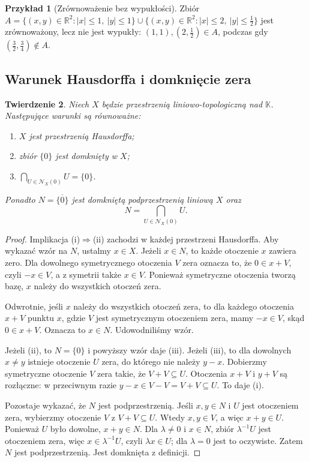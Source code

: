 \documentclass[11pt,a4paper]{article}
\numberwithin{equation}{section}
\theoremstyle{plain}
\newtheorem{twierdzenie}{Twierdzenie}[section]
\theoremstyle{definition}
\newtheorem{przyklad}[twierdzenie]{Przykład}
\theoremstyle{remark}
\newcommand{\R}{\mathbb R}
\newcommand{\K}{\mathbb K}
\newcommand{\cl}[1]{\overline{#1}}
\begin{document}
\begin{przyklad}[Zrównoważenie bez wypukłości]
Zbiór $A=\{(x,y)\in\R^2:|x|\leq1,\ |y|\leq1\}\cup
\{(x,y)\in\R^2:|x|\leq2,\ |y|\leq\frac12\}$
jest zrównoważony, lecz nie jest wypukły:
$(1,1),(2,\tfrac12)\in A$, podczas gdy
$(\tfrac32,\tfrac34)\notin A$.
\end{przyklad}

\subsection{Warunek Hausdorffa i domknięcie zera}

\begin{twierdzenie}\label{thm:hausdorff-zero}
Niech $X$ będzie przestrzenią liniowo-topologiczną nad $\K$.
Następujące warunki są równoważne:
\begin{enumerate}[label=\textup{(\roman*)}]
 \item $X$ jest przestrzenią Hausdorffa;
 \item zbiór $\{0\}$ jest domknięty w $X$;
 \item $\bigcap_{U\in\mathcal N_X(0)}U=\{0\}$.
\end{enumerate}
Ponadto $N=\cl{\{0\}}$ jest domkniętą podprzestrzenią liniową
$X$ oraz
\[
 N=\bigcap_{U\in\mathcal N_X(0)}U.
\]
\end{twierdzenie}
\begin{proof}
Implikacja (i)$\Rightarrow$(ii) zachodzi w każdej przestrzeni
Hausdorffa. Aby wykazać wzór na $N$, ustalmy $x\in X$.
Jeżeli $x\in N$, to każde otoczenie $x$ zawiera zero.
Dla dowolnego symetrycznego otoczenia $V$ zera oznacza to,
że $0\in x+V$, czyli $-x\in V$, a z symetrii także $x\in V$.
Ponieważ symetryczne otoczenia tworzą bazę, $x$ należy do
wszystkich otoczeń zera.

Odwrotnie, jeśli $x$ należy do wszystkich otoczeń zera,
to dla każdego otoczenia $x+V$ punktu $x$, gdzie $V$ jest
symetrycznym otoczeniem zera, mamy $-x\in V$, skąd
$0\in x+V$. Oznacza to $x\in N$. Udowodniliśmy wzór.

Jeżeli (ii), to $N=\{0\}$ i powyższy wzór daje (iii).
Jeżeli (iii), to dla dowolnych $x\ne y$ istnieje otoczenie
$U$ zera, do którego nie należy $y-x$. Dobierzmy symetryczne
otoczenie $V$ zera takie, że $V+V\subseteq U$. Otoczenia
$x+V$ i $y+V$ są rozłączne: w przeciwnym razie
$y-x\in V-V=V+V\subseteq U$. To daje (i).

Pozostaje wykazać, że $N$ jest podprzestrzenią.
Jeśli $x,y\in N$ i $U$ jest otoczeniem zera, wybierzmy
otoczenie $V$ z $V+V\subseteq U$. Wtedy $x,y\in V$,
a więc $x+y\in U$. Ponieważ $U$ było dowolne, $x+y\in N$.
Dla $\lambda\ne0$ i $x\in N$, zbiór $\lambda^{-1}U$
jest otoczeniem zera, więc $x\in\lambda^{-1}U$,
czyli $\lambda x\in U$; dla $\lambda=0$ jest to oczywiste.
Zatem $N$ jest podprzestrzenią. Jest domknięta z definicji.
\end{proof}
\end{document}
